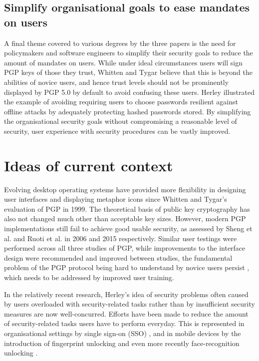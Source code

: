 \documentclass[11pt]{article}
\begin{document}
\subsection{Simplify organisational goals to ease mandates on users}

A final theme covered to various degrees by the three papers is the need for policymakers and software engineers to simplify their security goals to reduce the amount of mandates on users. While under ideal circumstances users will sign PGP keys of those they trust, Whitten and Tygar \cite[4.4]{whitten1999johnny} believe that this is beyond the abilities of novice users, and hence trust levels should not be prominently displayed by PGP 5.0 by default to avoid confusing these users. Herley \cite[2.4]{herley2014more} illustrated the example of avoiding requiring users to choose passwords resilient against offline attacks by adequately protecting hashed passwords stored. By simplifying the organisational security goals without compromising a reasonable level of security, user experience with security procedures can be vastly improved.  

\section{Ideas of current context}

Evolving desktop operating systems have provided more flexibility in designing user interfaces and displaying metaphor icons \cite[4.1]{whitten1999johnny} since Whitten and Tygar's \cite{whitten1999johnny} evaluation of PGP in 1999. The theoretical basis of public key cryptography has also not changed much other than acceptable key sizes. However, modern PGP implementations still fail to achieve good usable security, as assessed by Sheng et al. \cite{sheng2006johnny} and Ruoti et al. \cite{ruoti2015johnny} in 2006 and 2015 respectively. Similar user testings were performed across all three studies of PGP, while improvements to the interface design were recommended and improved between studies, the fundamental problem of the PGP protocol being hard to understand by novice users persist \cite[p. 4]{ruoti2015johnny}, which needs to be addressed by improved user training.

In the relatively recent research, Herley's \cite{herley2014more} idea of security problems often caused by users overloaded with security-related tasks rather than by insufficient security measures are now well-concurred. Efforts have been made to reduce the amount of security-related tasks users have to perform everyday. This is represented in organisational settings by single sign-on (SSO) \cite[8.1]{sasse2014great}, and in mobile devices by the introduction of fingerprint unlocking \cite{cherapau2015impact} and even more recently face-recognition unlocking \cite{applefaceid}.
\end{document}
